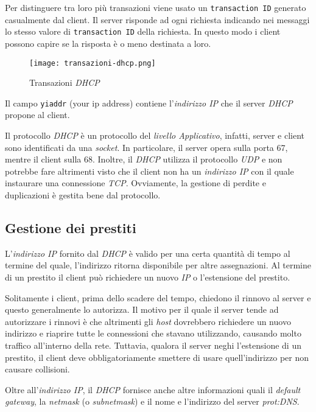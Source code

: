 \noindent
Per distinguere tra loro più transazioni viene usato un \texttt{transaction ID}
generato casualmente dal client. Il server risponde ad ogni richiesta indicando
nei messaggi lo stesso valore di \texttt{transaction ID} della richiesta. In
questo modo i client possono capire se la risposta è o meno destinata a loro.

\begin{figure}[ht]
    \centering
    \texttt{[image: transazioni-dhcp.png]}
    \caption{Transazioni \emph{DHCP}}
\end{figure}\noindent
Il campo \texttt{yiaddr} (your ip address) contiene l'\emph{indirizzo IP} che il
server \emph{DHCP} propone al client.

\begin{note}
    Il protocollo \emph{DHCP} è un protocollo del \emph{livello Applicativo},
    infatti, server e client sono identificati da una \emph{socket}. In
    particolare, il server opera sulla porta 67, mentre il client sulla 68.
    Inoltre, il \emph{DHCP} utilizza il protocollo \emph{UDP} e non potrebbe
    fare altrimenti visto che il client non ha un \emph{indirizzo IP} con il
    quale instaurare una connessione \emph{TCP}. Ovviamente, la gestione di
    perdite e duplicazioni è gestita bene dal protocollo.
\end{note}

\subsection{Gestione dei prestiti}
L'\emph{indirizzo IP} fornito dal \emph{DHCP} è valido per una certa quantità di
tempo al termine del quale, l'indirizzo ritorna disponibile per altre assegnazioni.
Al termine di un prestito il client può richiedere un nuovo \emph{IP} o
l'estensione del prestito.

Solitamente i client, prima dello scadere del tempo, chiedono il rinnovo al server
e questo generalmente lo autorizza. Il motivo per il quale il server tende ad
autorizzare i rinnovi è che altrimenti gli \emph{host} dovrebbero richiedere un
nuovo indirizzo e riaprire tutte le connessioni che stavano utilizzando, causando
molto traffico all'interno della rete. Tuttavia, qualora il server neghi
l'estensione di un prestito, il client deve obbligatoriamente smettere di usare
quell'indirizzo per non causare collisioni.

\begin{note}
    Oltre all'\emph{indirizzo IP}, il \emph{DHCP} fornisce anche altre informazioni
    quali il \emph{default gateway}, la \emph{netmask} (o \emph{subnetmask}) e
    il nome e l'indirizzo del server \emph{\gls{prot:DNS}}.
\end{note}

